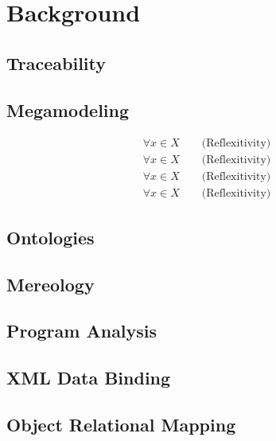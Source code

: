 \chapter{Background}
\lipsum[1]

\section{Traceability}
\lipsum[1]

\section{Megamodeling}
\begin{align}
\forall x \in X \qquad \text{(Reflexitivity)}
\\\forall x \in X \qquad \text{(Reflexitivity)}
\\\forall x \in X \qquad \text{(Reflexitivity)}
\\\forall x \in X \qquad \text{(Reflexitivity)}
\end{align}
\lipsum[1]

\section{Ontologies}
\lipsum[1]

\section{Mereology}
\lipsum[1]

\section{Program Analysis}
\lipsum[1]

\section{XML Data Binding}
\lipsum[1]

\section{Object Relational Mapping}
\lipsum[1]
